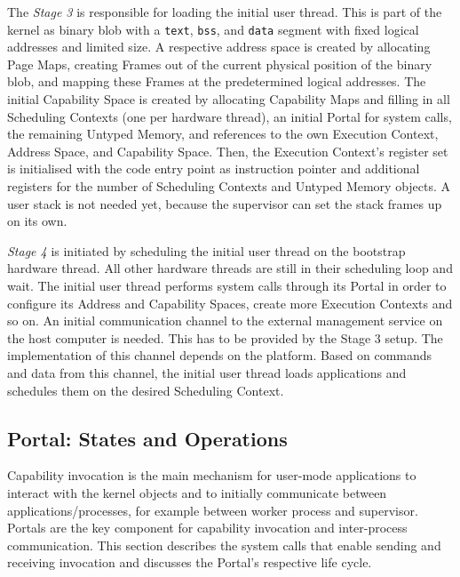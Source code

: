 The \emph{Stage 3} is responsible for loading the initial user thread. This is part of the kernel as binary blob with a \texttt{text}, \texttt{bss}, and \texttt{data} segment with fixed logical addresses and limited size. A respective address space is created by allocating Page Maps, creating Frames out of the current physical position of the binary blob, and mapping these Frames at the predetermined logical addresses. The initial Capability Space is created by allocating Capability Maps and filling in all Scheduling Contexts (one per hardware thread), an initial Portal for system calls, the remaining Untyped Memory, and references to the own Execution Context, Address Space, and Capability Space. Then, the Execution Context's register set is initialised with the code entry point as instruction pointer and additional registers for the number of Scheduling Contexts and Untyped Memory objects. A user stack is not needed yet, because the supervisor can set the stack frames up on its own.     

\emph{Stage 4} is initiated by scheduling the initial user thread on the bootstrap hardware thread. All other hardware threads are still in their scheduling loop and wait. The initial user thread performs system calls through its Portal in order to configure its Address and Capability Spaces, create more Execution Contexts and so on. An initial communication channel to the external management service on the host computer is needed. This has to be provided by the Stage 3 setup. The implementation of this channel depends on the platform. Based on commands and data from this channel, the initial user thread loads applications and schedules them on the desired Scheduling Context.

\subsection{Portal: States and Operations}
\label{sec:portal-dyn}

Capability invocation is the main mechanism for user-mode applications to interact with the kernel objects and to initially communicate between applications/processes, for example between worker process and supervisor. Portals  are the key component for capability invocation and inter-process communication. This section describes the system calls that enable sending and receiving invocation and discusses the Portal's respective life cycle.

